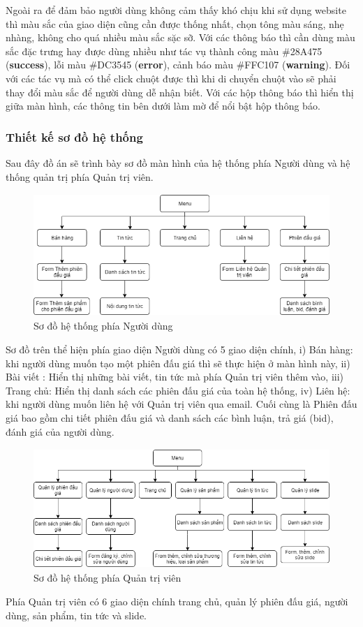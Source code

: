 \documentclass[../DoAn.tex]{subfiles}
\begin{document}
Ngoài ra để đảm bảo người dùng không cảm thấy khó chịu khi sử dụng website thì màu sắc của giao diện cũng cần được thống nhất, chọn tông màu sáng, nhẹ nhàng, không cho quá nhiều màu sắc sặc sỡ. Với các thông báo thì cần dùng màu sắc đặc trưng hay được dùng nhiều như tác vụ thành công màu \#28A475 (\textbf{success}), lỗi màu \#DC3545 (\textbf{error}), cảnh báo màu \#FFC107 (\textbf{warning}). Đối với các tác vụ mà có thể click chuột được thì khi di chuyển chuột vào sẽ phải thay đổi màu sắc để người dùng dễ nhận biết. Với các hộp thông báo thì hiển thị giữa màn hình, các thông tin bên dưới làm mờ để nổi bật hộp thông báo.
\subsubsection{Thiết kế sơ đồ hệ thống}
Sau đây đồ án sẽ trình bày sơ đồ màn hình của hệ thống phía Người dùng và hệ thống quản trị phía Quản trị viên.
\begin{figure}[H]
    \centering
    \includegraphics[width=0.75\linewidth,height=4.65cm]{Hinhve/clientpage.png}
    \caption{Sơ đồ hệ thống phía Người dùng}
    \label{fig:Fig46}
\end{figure}
Sơ đồ trên thể hiện phía giao diện Người dùng có 5 giao diện chính, i) Bán hàng: khi người dùng muốn tạo một phiên đấu giá thì sẽ thực hiện ở màn hình này, ii) Bài viết : Hiển thị những bài viết, tin tức mà phía Quản trị viên thêm vào, iii) Trang chủ:  Hiển thị danh sách các phiên đấu giá của toàn hệ thống, iv) Liên hệ: khi người dùng muốn liên hệ với Quản trị viên qua email. Cuối cùng là Phiên đấu giá bao gồm chi tiết phiên đấu giá và danh sách các bình luận, trả giá (bid), đánh giá của người dùng.
\begin{figure}[H]
    \centering
    \includegraphics[width=0.75\linewidth,height=4.54cm]{Hinhve/adminpage.png}
    \caption{Sơ đồ hệ thống phía Quản trị viên}
    \label{fig:Fig47}
\end{figure}
Phía Quản trị viên có 6 giao diện chính trang chủ, quản lý phiên đấu giá, người dùng, sản phẩm, tin tức và slide.
\newpage
\end{document}
